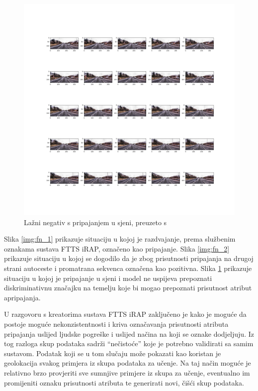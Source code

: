 \documentclass[times, utf8, diplomski, numeric]{fer}
\begin{document}
\begin{figure}[H]
\centering
\includegraphics[scale=0.3]{images/fn_2.png}
\caption{Lažni negativ s pripajanjem u sjeni, preuzeto s \citep{url:ftts_irap}}
\label{img:fn_3}
\end{figure}

Slika \ref{img:fn_1} prikazuje situaciju u kojoj je razdvajanje, prema službenim oznakama sustava FTTS iRAP, označeno kao pripajanje. 
Slika \ref{img:fn_2} prikazuje situaciju u kojoj se dogodilo da je zbog prisutnosti pripajanja na drugoj strani autoceste i promatrana sekvenca označena kao pozitivna.
Slika \ref{img:fn_3} prikazuje situaciju u kojoj je pripajanje u sjeni i model ne uspijeva prepoznati diskriminativnu značajku na temelju koje bi mogao prepoznati prisutnost atribut apripajanja.

U razgovoru s kreatorima sustava FTTS iRAP zaključeno je kako je moguće da postoje moguće nekonzistentnosti i kriva označavanja prisutnosti atributa pripajanja uslijed ljudske pogreške i uslijed načina na koji se oznake dodjeljuju.
Iz tog razloga skup podataka sadrži ``nečistoće'' koje je potrebno validirati sa samim sustavom. 
Podatak koji se u tom slučaju može pokazati kao koristan je geolokacija svakog primjera iz skupa podataka za učenje.
Na taj način moguće je relativno brzo provjeriti sve sumnjive primjere iz skupa za učenje, eventualno im promijeniti oznaku prisutnosti atributa te generirati novi, čišći skup podataka.
\end{document}
